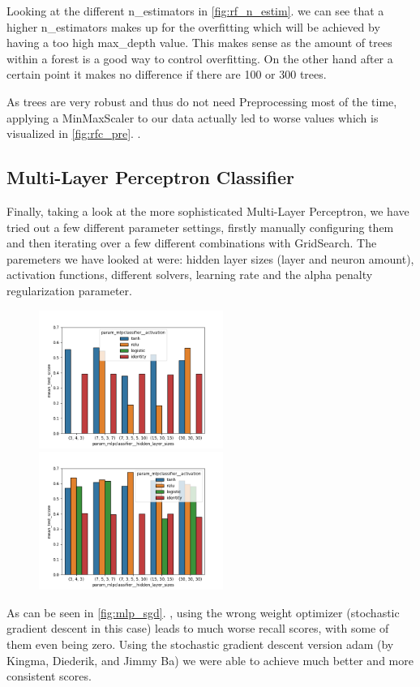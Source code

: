 \documentclass{article}
\newcommand{\secref}[1]{\autoref{#1}. \texit{\nameref{#1}}}
\begin{document}
Looking at the different n\_estimators in \secref{fig:rf_n_estim} we can see that a higher n\_estimators makes up for the overfitting which will be achieved by having a too high max\_depth value. This makes sense as the amount of trees within a forest is a good way to control overfitting. On the other hand after a certain point it makes no difference if there are 100 or 300 trees.

As trees are very robust and thus do not need Preprocessing most of the time, applying a MinMaxScaler to our data actually led to worse values which is visualized in \secref{fig:rfc_pre}.

\subsection{Multi-Layer Perceptron Classifier}
Finally, taking a look at the more sophisticated Multi-Layer Perceptron, we have tried out a few different parameter settings, firstly manually configuring them and then iterating over a few different combinations with GridSearch. The paremeters we have looked at were: hidden layer sizes (layer and neuron amount), activation functions, different solvers, learning rate and the alpha penalty regularization parameter.


\begin{figure}
\begin{floatrow}
    {\includegraphics[width=6cm]{plots/mlp_solver_comparisonsgd.png}\label{fig:mlp_sgd}}
    {\includegraphics[width=6cm]{plots/mlp_solver_comparisonadam.png}\label{fig:mlp_adam}}
\end{floatrow}
\end{figure}
As can be seen in \secref{fig:mlp_sgd}, using the wrong weight optimizer (stochastic gradient descent in this case) leads to much worse recall scores, with some of them even being zero. Using the stochastic gradient descent version adam (by Kingma, Diederik, and Jimmy Ba) we were able to achieve much better and more consistent scores.
\end{document}
